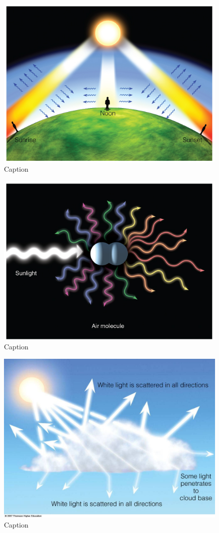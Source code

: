 \documentclass[oneside]{book}
\begin{document}
\begin{figure}

{\centering \includegraphics[width=0.5\linewidth]{figures/Figure124} 

}

\caption{Caption}\label{fig:Scattering}
\end{figure}

\begin{figure}

{\centering \includegraphics[width=0.5\linewidth]{figures/Figure125} 

}

\caption{Caption}\label{fig:Scattering2}
\end{figure}

\begin{figure}

{\centering \includegraphics[width=0.5\linewidth]{figures/Figure126} 

}

\caption{Caption}\label{fig:Scattering3}
\end{figure}
\end{document}
